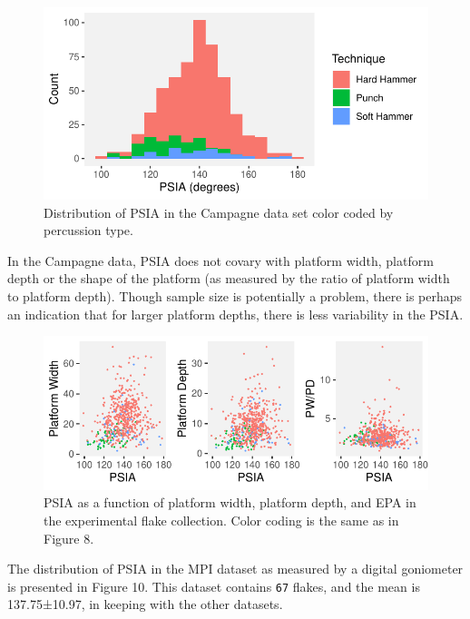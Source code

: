 \documentclass[10pt,letterpaper]{article}
\begin{document}
\begin{figure}
\centering
\includegraphics{PSIA_Manuscript_files/figure-latex/fig8-camp_angles-1.pdf}
\caption{Distribution of PSIA in the Campagne data set color coded by
percussion type.}
\end{figure}

In the Campagne data, PSIA does not covary with platform width, platform
depth or the shape of the platform (as measured by the ratio of platform
width to platform depth). Though sample size is potentially a problem,
there is perhaps an indication that for larger platform depths, there is
less variability in the PSIA.

\begin{figure}
\centering
\includegraphics{PSIA_Manuscript_files/figure-latex/fig9-PSIA_to_other_measures-1.pdf}
\caption{PSIA as a function of platform width, platform depth, and EPA
in the experimental flake collection. Color coding is the same as in
Figure 8.}
\end{figure}

The distribution of PSIA in the MPI dataset as measured by a digital
goniometer is presented in Figure 10. This dataset contains \texttt{67}
flakes, and the mean is 137.75±10.97, in keeping with the other
datasets.
\end{document}
